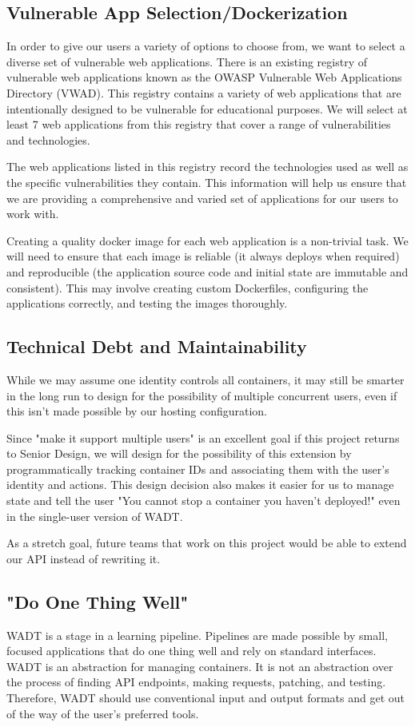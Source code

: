 \documentclass[12pt]{article}
\begin{document}
\subsection{Vulnerable App Selection/Dockerization}
In order to give our users a variety of options to choose from, we want to select a diverse set of vulnerable web applications. There is an existing registry of vulnerable web applications known as the OWASP Vulnerable Web Applications Directory (VWAD). This registry contains a variety of web applications that are intentionally designed to be vulnerable for educational purposes. We will select at least 7 web applications from this registry that cover a range of vulnerabilities and technologies.

The web applications listed in this registry record the technologies used as well as the specific vulnerabilities they contain. This information will help us ensure that we are providing a comprehensive and varied set of applications for our users to work with.

Creating a quality docker image for each web application is a non-trivial task. We will need to ensure that each image is reliable (it always deploys when required) and reproducible (the application source code and initial state are immutable and consistent). This may involve creating custom Dockerfiles, configuring the applications correctly, and testing the images thoroughly.

\subsection{Technical Debt and Maintainability}
While we may assume one identity controls all containers, it may still be smarter in the long run to design for the possibility of multiple concurrent users, even if this isn't made possible by our hosting configuration.

Since "make it support multiple users" is an excellent goal if this project returns to Senior Design, we will design for the possibility of this extension by programmatically tracking container IDs and associating them with the user's identity and actions. This design decision also makes it easier for us to manage state and tell the user "You cannot stop a container you haven't deployed!" even in the single-user version of WADT.

As a stretch goal, future teams that work on this project would be able to extend our API instead of rewriting it.

\subsection{"Do One Thing Well"}
WADT is a stage in a learning pipeline. Pipelines are made possible by small, focused applications that do one thing well and rely on standard interfaces. WADT is an abstraction for managing containers. It is not an abstraction over the process of finding API endpoints, making requests, patching, and testing. Therefore, WADT should use conventional input and output formats and get out of the way of the user's preferred tools.
\end{document}
